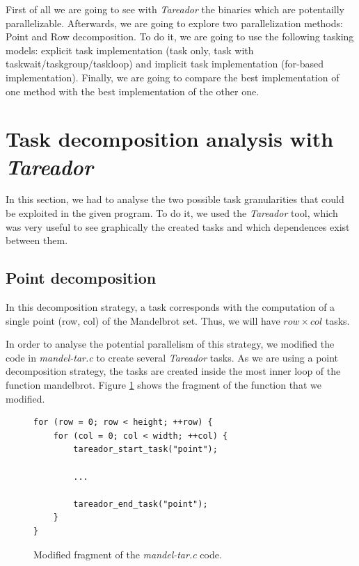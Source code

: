 \documentclass[12pt, a4paper]{article}
\begin{document}
First of all we are going to see with \textit{Tareador} the binaries which are potentailly parallelizable. Afterwards, we are going to explore two parallelization methods: Point and Row decomposition. To do it, we are going to use the following tasking models: explicit task implementation (task only, task with taskwait/taskgroup/taskloop) and implicit task implementation (for-based implementation). Finally, we are going to compare the best implementation of one method with the best implementation of the other one.

\newpage

\section{Task decomposition analysis with \textit{Tareador}}
\label{sec:tareador}

In this section, we had to analyse the two possible task granularities that could be exploited in the given program. To do it, we used the \textit{Tareador} tool, which was very useful to see graphically the created tasks and which dependences exist between them.

\subsection{Point decomposition}

In this decomposition strategy, a task corresponds with the computation of a single point (row, col) of the Mandelbrot set. Thus, we will have $row \times col$ tasks.

In order to analyse the potential parallelism of this strategy, we modified the code in \textit{mandel-tar.c} to create several \textit{Tareador} tasks. As we are using a point decomposition strategy, the tasks are created inside the most inner loop of the function mandelbrot.  Figure \ref{code:mandeltarPoint} shows the fragment of the function that we modified.

\begin{figure}[H]
\begin{lstlisting}
for (row = 0; row < height; ++row) {
	for (col = 0; col < width; ++col) {
		tareador_start_task("point");
		
		...
		
		tareador_end_task("point");
	}
}
\end{lstlisting}
\caption{Modified fragment of the \textit{mandel-tar.c} code.}
\label{code:mandeltarPoint}
\end{figure}
\end{document}
